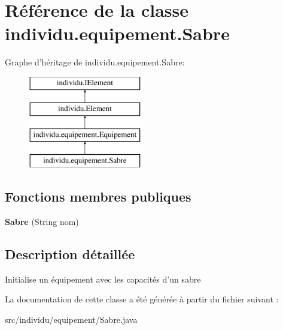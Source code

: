 \hypertarget{classindividu_1_1equipement_1_1_sabre}{\section{Référence de la classe individu.\-equipement.\-Sabre}
\label{classindividu_1_1equipement_1_1_sabre}
}
Graphe d'héritage de individu.\-equipement.\-Sabre\-:\begin{figure}[H]
\begin{center}
\leavevmode
\includegraphics[height=4.000000cm]{classindividu_1_1equipement_1_1_sabre}
\end{center}
\end{figure}
\subsection*{Fonctions membres publiques}
\begin{DoxyCompactItemize}
\item 
\hypertarget{classindividu_1_1equipement_1_1_sabre_a0480e9c7f234f72d0453950787e0421e}{{\bfseries Sabre} (String nom)}\label{classindividu_1_1equipement_1_1_sabre_a0480e9c7f234f72d0453950787e0421e}

\end{DoxyCompactItemize}


\subsection{Description détaillée}
Initialise un équipement avec les capacités d'un sabre 

La documentation de cette classe a été générée à partir du fichier suivant \-:\begin{DoxyCompactItemize}
\item 
src/individu/equipement/Sabre.\-java\end{DoxyCompactItemize}

